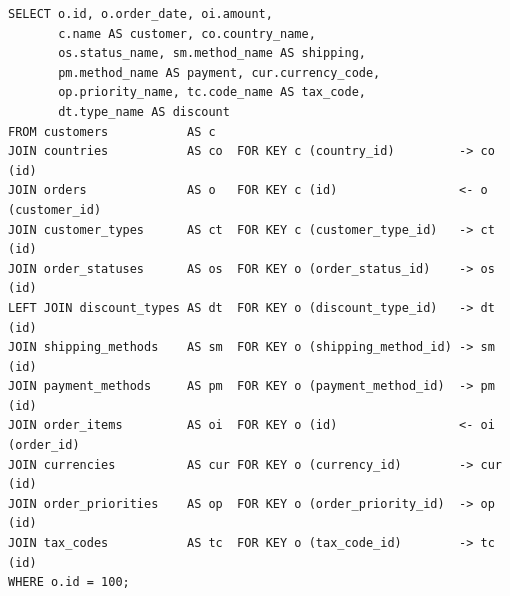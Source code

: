 \documentclass[12pt]{article}
\newcommand{\FanoutCheckHeight}[3]{%
  \ifdim\dimexpr\ht#1+\dp#1\relax>#2\relax
    \PackageError{fanout-layout}{#3 exceeds its vertical allocation}%
      {Adjust the terminal line spacing or the box position.}%
  \fi
}
\begin{document}
\newsavebox{\canonicalStageThree}
\begin{lrbox}{\canonicalStageThree}\begin{minipage}{344mm}
\begin{NoHyper}
\begin{lstlisting}[style=complex-sql]
SELECT o.id, o.order_date, oi.amount,
       c.name AS customer, co.country_name,
       os.status_name, sm.method_name AS shipping,
       pm.method_name AS payment, cur.currency_code,
       op.priority_name, tc.code_name AS tax_code,
       dt.type_name AS discount
FROM customers           AS c
JOIN countries           AS co  FOR KEY c (country_id)         -> co (id)
JOIN orders              AS o   FOR KEY c (id)                 <- o (customer_id)
JOIN customer_types      AS ct  FOR KEY c (customer_type_id)   -> ct (id)
JOIN order_statuses      AS os  FOR KEY o (order_status_id)    -> os (id)
LEFT JOIN discount_types AS dt  FOR KEY o (discount_type_id)   -> dt (id)
JOIN shipping_methods    AS sm  FOR KEY o (shipping_method_id) -> sm (id)
JOIN payment_methods     AS pm  FOR KEY o (payment_method_id)  -> pm (id)
JOIN order_items         AS oi  FOR KEY o (id)                 <- oi (order_id)
JOIN currencies          AS cur FOR KEY o (currency_id)        -> cur (id)
JOIN order_priorities    AS op  FOR KEY o (order_priority_id)  -> op (id)
JOIN tax_codes           AS tc  FOR KEY o (tax_code_id)        -> tc (id)
WHERE o.id = 100;
\end{lstlisting}
\end{NoHyper}
\end{minipage}\end{lrbox}
\FanoutCheckHeight{\canonicalStageThree}{122mm}{Canonical-form state 3}
\end{document}
